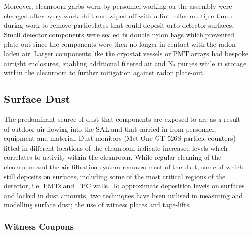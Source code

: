 Moreover, cleanroom garbs worn by personnel working on the assembly were changed after every work shift and wiped off with a lint roller multiple times during work to remove particulates that could deposit onto detector surfaces. Small detector components were sealed in double nylon bags which prevented plate-out since the components were then no longer in contact with the radon-laden air. Larger components like the cryostat vessels or PMT arrays had bespoke airtight enclosures, enabling additional filtered air and N$_{2}$ purges while in storage within the cleanroom to further mitigation against radon plate-out.


\subsection{Surface Dust}
\label{secsec:surface_dust}

The predominant source of dust that components are exposed to are as a result of outdoor air flowing into the SAL and that carried in from personnel, equipment and material. Dust monitors (Met One GT-526S particle counters) fitted in different locations of the cleanroom indicate increased levels which correlates to activity within the cleanroom. While regular cleaning of the cleanroom and the air filtration system removes most of the dust, some of which still deposits on surfaces, including some of the most critical regions of the detector, i.e. PMTs and TPC walls. To approximate deposition levels on surfaces and locked in dust amounts, two techniques have been utilised in measuring and modelling surface dust; the use of witness plates and tape-lifts. 


\subsubsection{Witness Coupons}


